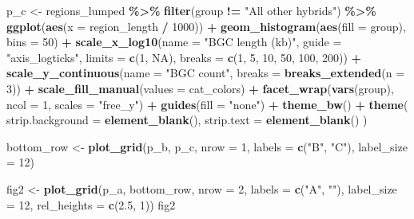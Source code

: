 \documentclass[
]{article}
\newenvironment{Shaded}{\begin{snugshade}}{\end{snugshade}}
\newcommand{\AttributeTok}[1]{\textcolor[rgb]{0.13,0.29,0.53}{#1}}
\newcommand{\ConstantTok}[1]{\textcolor[rgb]{0.56,0.35,0.01}{#1}}
\newcommand{\DecValTok}[1]{\textcolor[rgb]{0.00,0.00,0.81}{#1}}
\newcommand{\FloatTok}[1]{\textcolor[rgb]{0.00,0.00,0.81}{#1}}
\newcommand{\FunctionTok}[1]{\textcolor[rgb]{0.13,0.29,0.53}{\textbf{#1}}}
\newcommand{\NormalTok}[1]{#1}
\newcommand{\OtherTok}[1]{\textcolor[rgb]{0.56,0.35,0.01}{#1}}
\newcommand{\SpecialCharTok}[1]{\textcolor[rgb]{0.81,0.36,0.00}{\textbf{#1}}}
\newcommand{\StringTok}[1]{\textcolor[rgb]{0.31,0.60,0.02}{#1}}
\begin{document}
\begin{Shaded}
\begin{Highlighting}[]
\NormalTok{p\_c }\OtherTok{\textless{}{-}}\NormalTok{ regions\_lumped }\SpecialCharTok{\%\textgreater{}\%}
  \FunctionTok{filter}\NormalTok{(group }\SpecialCharTok{!=} \StringTok{"All other hybrids"}\NormalTok{) }\SpecialCharTok{\%\textgreater{}\%}
  \FunctionTok{ggplot}\NormalTok{(}\FunctionTok{aes}\NormalTok{(}\AttributeTok{x =}\NormalTok{ region\_length }\SpecialCharTok{/} \DecValTok{1000}\NormalTok{)) }\SpecialCharTok{+}
      \FunctionTok{geom\_histogram}\NormalTok{(}\FunctionTok{aes}\NormalTok{(}\AttributeTok{fill =}\NormalTok{ group), }\AttributeTok{bins =} \DecValTok{50}\NormalTok{) }\SpecialCharTok{+}
      \FunctionTok{scale\_x\_log10}\NormalTok{(}\AttributeTok{name =} \StringTok{"BGC length (kb)"}\NormalTok{, }\AttributeTok{guide =} \StringTok{"axis\_logticks"}\NormalTok{, }\AttributeTok{limits =} \FunctionTok{c}\NormalTok{(}\DecValTok{1}\NormalTok{, }\ConstantTok{NA}\NormalTok{), }\AttributeTok{breaks =} \FunctionTok{c}\NormalTok{(}\DecValTok{1}\NormalTok{, }\DecValTok{5}\NormalTok{, }\DecValTok{10}\NormalTok{, }\DecValTok{50}\NormalTok{, }\DecValTok{100}\NormalTok{, }\DecValTok{200}\NormalTok{)) }\SpecialCharTok{+}
      \FunctionTok{scale\_y\_continuous}\NormalTok{(}\AttributeTok{name =} \StringTok{"BGC count"}\NormalTok{, }\AttributeTok{breaks =} \FunctionTok{breaks\_extended}\NormalTok{(}\AttributeTok{n =} \DecValTok{3}\NormalTok{)) }\SpecialCharTok{+}
      \FunctionTok{scale\_fill\_manual}\NormalTok{(}\AttributeTok{values =}\NormalTok{ cat\_colors) }\SpecialCharTok{+}
      \FunctionTok{facet\_wrap}\NormalTok{(}\FunctionTok{vars}\NormalTok{(group), }\AttributeTok{ncol =} \DecValTok{1}\NormalTok{, }\AttributeTok{scales =} \StringTok{"free\_y"}\NormalTok{) }\SpecialCharTok{+}
      \FunctionTok{guides}\NormalTok{(}\AttributeTok{fill =} \StringTok{"none"}\NormalTok{) }\SpecialCharTok{+}
      \FunctionTok{theme\_bw}\NormalTok{() }\SpecialCharTok{+}
      \FunctionTok{theme}\NormalTok{(}
        \AttributeTok{strip.background =} \FunctionTok{element\_blank}\NormalTok{(),}
        \AttributeTok{strip.text =} \FunctionTok{element\_blank}\NormalTok{()}
\NormalTok{      )}

\NormalTok{bottom\_row }\OtherTok{\textless{}{-}} \FunctionTok{plot\_grid}\NormalTok{(p\_b, p\_c, }\AttributeTok{nrow =} \DecValTok{1}\NormalTok{, }\AttributeTok{labels =} \FunctionTok{c}\NormalTok{(}\StringTok{"B"}\NormalTok{, }\StringTok{"C"}\NormalTok{), }\AttributeTok{label\_size =} \DecValTok{12}\NormalTok{)}

\NormalTok{fig2 }\OtherTok{\textless{}{-}} \FunctionTok{plot\_grid}\NormalTok{(p\_a, bottom\_row, }\AttributeTok{nrow =} \DecValTok{2}\NormalTok{, }\AttributeTok{labels =} \FunctionTok{c}\NormalTok{(}\StringTok{"A"}\NormalTok{, }\StringTok{""}\NormalTok{), }\AttributeTok{label\_size =} \DecValTok{12}\NormalTok{, }\AttributeTok{rel\_heights =} \FunctionTok{c}\NormalTok{(}\FloatTok{2.5}\NormalTok{, }\DecValTok{1}\NormalTok{))}
\NormalTok{fig2}
\end{Highlighting}
\end{Shaded}
\end{document}
